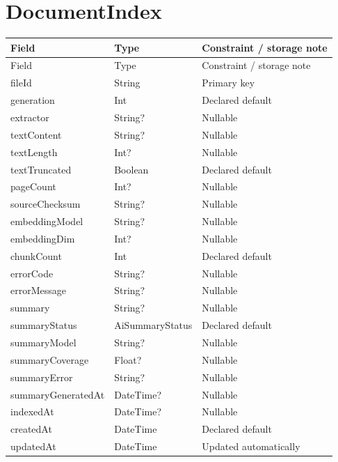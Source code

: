 \section{DocumentIndex}
\begin{longtable}{p{.31\linewidth}p{.23\linewidth}p{.36\linewidth}}\toprule Field&Type&Constraint / storage note\\\midrule\endfirsthead\toprule Field&Type&Constraint / storage note\\\midrule\endhead
fileId&String&Primary key\\
generation&Int&Declared default\\
extractor&String?&Nullable\\
textContent&String?&Nullable\\
textLength&Int?&Nullable\\
textTruncated&Boolean&Declared default\\
pageCount&Int?&Nullable\\
sourceChecksum&String?&Nullable\\
embeddingModel&String?&Nullable\\
embeddingDim&Int?&Nullable\\
chunkCount&Int&Declared default\\
errorCode&String?&Nullable\\
errorMessage&String?&Nullable\\
summary&String?&Nullable\\
summaryStatus&AiSummaryStatus&Declared default\\
summaryModel&String?&Nullable\\
summaryCoverage&Float?&Nullable\\
summaryError&String?&Nullable\\
summaryGeneratedAt&DateTime?&Nullable\\
indexedAt&DateTime?&Nullable\\
createdAt&DateTime&Declared default\\
updatedAt&DateTime&Updated automatically\\
\bottomrule\end{longtable}

